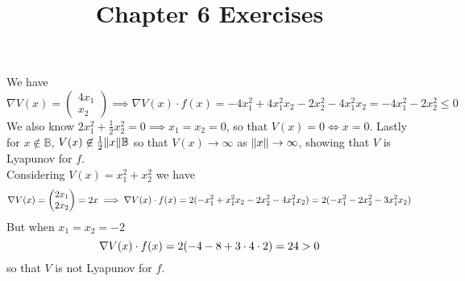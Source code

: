 \documentclass{article}
\title{Chapter 6 Exercises}
\newenvironment{ex}[1]
  {\renewcommand\theexercise{#1}\exercise}
  {\endexercise}
\newcommand{\B}{\mathbb{B}}
\begin{document}
\begin{ex}{6.1} %
  We have
  $$
  \nabla V(x) = \begin{pmatrix} 4x_1 \\ x_2 \end{pmatrix} \implies \nabla V(x) \cdot f(x) = -4x_1^2 + 4x_1^2 x_2 -2x_2^2 - 4x_1^2x_2 = -4x_1^2 - 2x_2^2 \le 0
  $$
  We also know $2x_1^2 + \frac{1}{2}x_2^2 = 0 \implies x_1 = x_2 = 0$, so that $V(x) = 0 \iff x = 0$. Lastly for $x \not\in \B$, $V(x) \not\in \frac{1}{2} \norm{x} \B$ so that $V(x) \to \infty$ as $\lVert x\rVert \to \infty$, showing that $V$ is Lyapunov for $f$. \, \\

  Considering $V(x) = x_1^2 + x_2^2$ we have
  $$
  \nabla V(x) = \begin{pmatrix} 2x_1 \\ 2x_2 \end{pmatrix} = 2x \implies \nabla V(x) \cdot f(x) = 2 ( -x_1^2 + x_1^2x_2 - 2x_2^2 - 4x_1^2x_2 ) = 2( -x_1^2 - 2x_2^2 - 3x_1^2x_2 )
  $$
  But when $x_1 = x_2 = -2$
  $$
  \nabla V(x) \cdot f(x) = 2 ( -4 - 8 + 3\cdot 4 \cdot 2 ) = 24 > 0
  $$
  so that $V$ is not Lyapunov for $f$.
\end{ex} %
\end{document}
